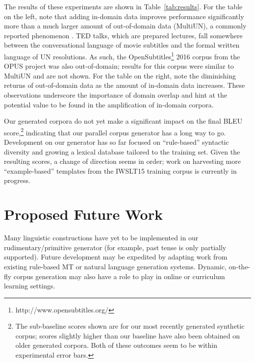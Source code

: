 The results of these experiments are shown in Table~\ref{tab:results}.
For the table on the left, note that adding in-domain data improves performance significantly more than a much larger amount of out-of-domain data (MultiUN), a commonly reported phenomenon .
TED talks, which are prepared lectures, fall somewhere between the conversational language of movie subtitles and the formal written language of UN resolutions.
As such, the OpenSubtitles\footnote{http://www.opensubtitles.org/} 2016 corpus  from the OPUS project was also out-of-domain; results for this corpus were similar to MultiUN and are not shown.
For the table on the right, note the diminishing returns of out-of-domain data as the amount of in-domain data increases.
These observations underscore the importance of domain overlap and hint at the potential value to be found in the amplification of in-domain corpora.

Our generated corpora do not yet make a significant impact on the final BLEU score,\footnote{
    The sub-baseline scores shown are for our most recently generated synthetic corpus; scores slightly higher than our baseline have also been obtained on older generated corpora.
    Both of these outcomes seem to be within experimental error bars.
}
indicating that our parallel corpus generator has a long way to go.
Development on our generator has so far focused on ``rule-based'' syntactic diversity and growing a lexical database tailored to the training set. 
Given the resulting scores, a change of direction seems in order; work on harvesting more ``example-based'' templates from the IWSLT15 training corpus is currently in progress.









\section{Proposed Future Work}
\label{sec:future}


Many linguistic constructions have yet to be implemented in our rudimentary/primitive generator (for example, past tense is only partially supported).
Future development may be expedited by adapting work from existing rule-based MT or natural language generation systems. 
Dynamic, on-the-fly corpus generation may also have a role to play in online or curriculum learning settings.


